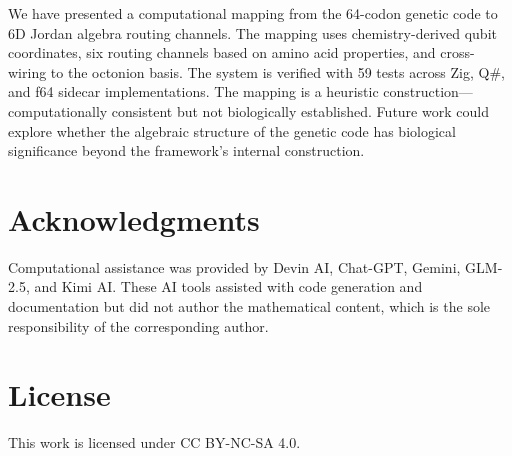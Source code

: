 \documentclass[11pt]{article}
\begin{document}
We have presented a computational mapping from the 64-codon genetic code to 6D Jordan algebra routing channels. The mapping uses chemistry-derived qubit coordinates, six routing channels based on amino acid properties, and cross-wiring to the octonion basis. The system is verified with 59 tests across Zig, Q\#, and f64 sidecar implementations. The mapping is a heuristic construction---computationally consistent but not biologically established. Future work could explore whether the algebraic structure of the genetic code has biological significance beyond the framework's internal construction.

\section*{Acknowledgments}

Computational assistance was provided by Devin AI, Chat-GPT, Gemini, GLM-2.5, and Kimi AI. These AI tools assisted with code generation and documentation but did not author the mathematical content, which is the sole responsibility of the corresponding author.

\section*{License}

This work is licensed under CC BY-NC-SA 4.0.



\end{document}
